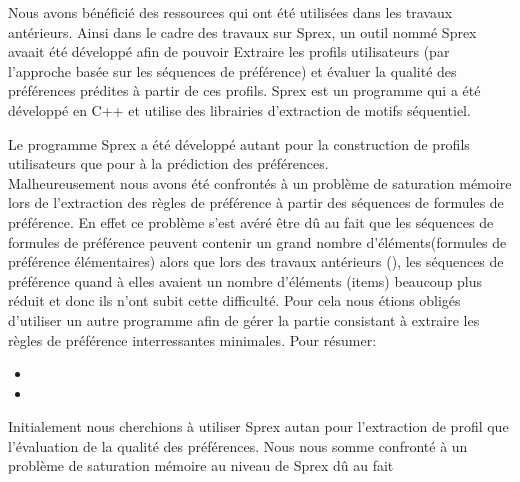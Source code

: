 \documentclass[a4paper,12pt,openany,oneside]{article}
\begin{document}
Nous avons bénéficié des ressources qui ont été utilisées dans les travaux antérieurs. Ainsi dans le cadre des travaux sur Sprex, un outil nommé Sprex avaait été développé afin de pouvoir Extraire les profils utilisateurs (par l'approche basée sur les séquences de préférence) et évaluer la qualité des préférences prédites à partir de ces profils. Sprex est un programme qui a été développé en C++ et utilise des librairies d'extraction de motifs séquentiel.

Le programme Sprex a été développé autant pour  la construction de profils utilisateurs que pour à la prédiction des préférences.\\
 Malheureusement nous avons été confrontés à un problème de saturation mémoire lors de l'extraction des règles de préférence à partir des séquences de formules de préférence. En effet ce problème s'est avéré être dû au fait que les séquences de formules de préférence peuvent contenir un grand nombre d'éléments(formules de préférence élémentaires) alors que lors des travaux antérieurs (\cite{}), les séquences de préférence quand à elles avaient un nombre d'éléments (items) beaucoup plus réduit et donc ils n'ont subit cette difficulté. Pour cela nous étions obligés d'utiliser un autre programme afin de gérer la partie consistant à extraire les règles de préférence interressantes minimales. Pour résumer:
\begin{itemize}
\item  
\item
\end{itemize}



Initialement nous cherchions à utiliser Sprex autan pour l'extraction de profil que l'évaluation de la qualité des préférences. Nous nous somme confronté à un problème de saturation mémoire au niveau de Sprex dû au fait
\end{document}

